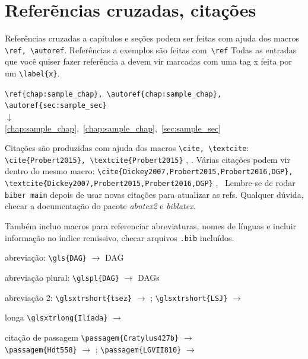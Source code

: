 \documentclass[hittite,linearb,armenian,hebraico,russian,sanskrit]{tesecaiera}
\begin{document}
\chapter{Referẽncias cruzadas, citações}

\noindent Referências cruzadas a capítulos e seções podem ser feitas com ajuda dos macros
\lstinline!\ref, \autoref!. 
Referências a exemplos são feitas com~\lstinline!\ref!
Todas as entradas que você quiser fazer referência a devem vir marcadas com uma
tag x feita por um \lstinline!\label{x}!.

\begin{center}
\lstinline!\ref{chap:sample_chap}, \autoref{chap:sample_chap}, \autoref{sec:sample_sec}!\\
$\downarrow$\\
 \ref{chap:sample_chap},~\autoref{chap:sample_chap},~\autoref{sec:sample_sec}
\end{center} 

Citações são produzidas com ajuda dos macros \lstinline!\cite, \textcite!:
\lstinline!\cite{Probert2015}, \textcite{Probert2015}!
\cite{Probert2015}, \textcite{Probert2015}.
Várias citações podem vir dentro do mesmo macro:
\lstinline!\cite{Dickey2007,Probert2015,Probert2016,DGP}, \textcite{Dickey2007,Probert2015,Probert2016,DGP}!
\cite{Dickey2007,Probert2015,Probert2016,DGP},~\textcite{Dickey2007,Probert2015,Probert2016,DGP}
Lembre-se de rodar \lstinline{biber main} depois de usar novas citações para
atualizar as refs.
Qualquer dúvida, checar a documentação do pacote \emph{abntex2} e \emph{biblatex}.

Também incluo macros para referenciar abreviaturas, nomes de línguas e incluir informação no índice remissivo, checar arquivos \texttt{.bib} incluídos.
\begin{compactitem}
\item abreviação: \lstinline!\gls{DAG}! $\rightarrow$ \gls{DAG}
\item abreviação plural: \lstinline!\glspl{DAG}! $\rightarrow$ \glspl{DAG}
\item abreviação 2: \lstinline!\glsxtrshort{tsez}! $\rightarrow$
  ; \lstinline!\glsxtrshort{LSJ}! $\rightarrow$ 
\item longa \lstinline!\glsxtrlong{Ilíada}! $\rightarrow$ 
\item citação de passagem \lstinline!\passagem{Cratylus427b}! $\rightarrow$
  \\
 \lstinline!\passagem{Hdt558}! $\rightarrow$ ;
 \lstinline!\passagem{LGVII810}! $\rightarrow$ 

\end{compactitem}
\end{document}

